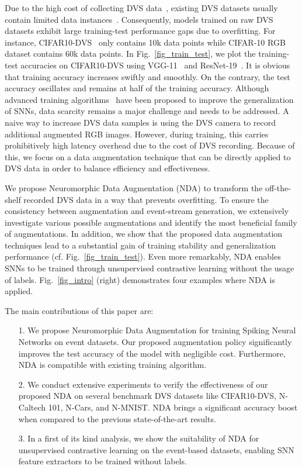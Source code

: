 \documentclass[runningheads]{llncs}
\begin{document}
Due to the high cost of collecting DVS data~\cite{lin2021imagenet}, existing DVS datasets usually contain limited data instances~\cite{li2017cifar10}. 
Consequently, models trained on raw DVS datasets exhibit large training-test performance gaps due to overfitting. 
For instance, CIFAR10-DVS~\cite{li2017cifar10} only contains 10k data points while CIFAR-10 RGB dataset contains 60k data points.
In Fig.~\ref{fig_train_test}, we plot the training-test accuracies on CIFAR10-DVS using VGG-11~\cite{simonyan2014very} and ResNet-19~\cite{he2016deep}.
It is obvious that training accuracy increases swiftly and smoothly. On the contrary, the test accuracy oscillates and remains at half of the training accuracy.
Although advanced training algorithms~\cite{zheng2020going,fang2021incorporating}
have been proposed to improve the generalization of SNNs, data scarcity remains a major challenge and needs to be addressed. 
A naive way to increase DVS data samples is using the DVS camera to record additional augmented RGB images.
However, during training, this carries prohibitively high latency overhead due to the cost of DVS recording. 
Because of this, we focus on a data augmentation technique that can be directly applied to DVS data in order to balance efficiency and effectiveness.



We propose Neuromorphic Data Augmentation (NDA) to transform the off-the-shelf recorded DVS data in a way that prevents overfitting. To ensure the consistency between augmentation and event-stream generation, we extensively investigate various possible augmentations and identify the most beneficial family of augmentations.
In addition, we show that the proposed data augmentation techniques lead to a substantial gain of training stability and generalization performance (cf. Fig.~\ref{fig_train_test}).
Even more remarkably, NDA enables SNNs to be trained through unsupervised contrastive learning without the usage of labels.
Fig.~\ref{fig_intro} (right) demonstrates four examples where NDA is applied. 

The main contributions of this paper are:
\begin{enumerate}[nosep]
    \item[1.] We propose Neuromorphic Data Augmentation for training Spiking Neural Networks on event datasets. Our proposed augmentation policy significantly improves the test accuracy of the model with negligible cost. Furthermore, NDA is compatible with existing training algorithm. 
    \item[2.] We conduct extensive experiments to verify the effectiveness of our proposed NDA on several benchmark DVS datasets like CIFAR10-DVS, N-Caltech 101, N-Cars, and N-MNIST. NDA brings a significant accuracy boost when compared to the previous state-of-the-art results. 
    \item[3.] In a first of its kind analysis, we show the suitability of NDA for unsupervised contrastive learning on the event-based datasets, enabling SNN feature extractors to be trained without labels. 
\end{enumerate}
\end{document}
